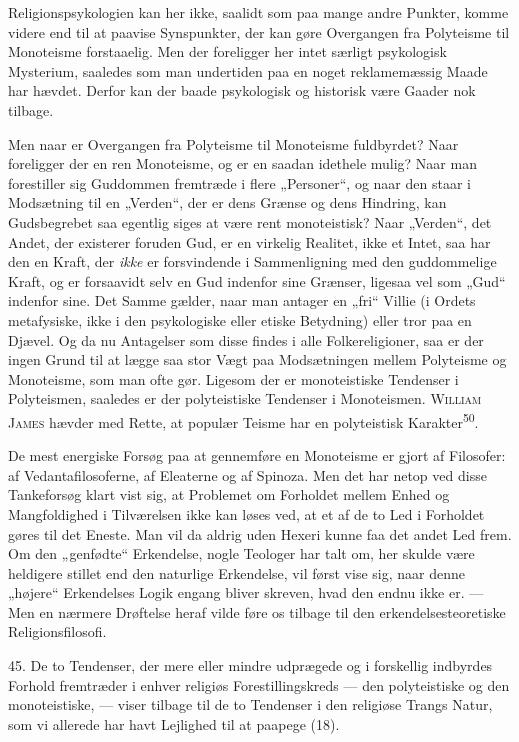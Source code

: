 \documentclass[12pt,a4paper,openany]{book}
\newcommand{\opage}[1]{\marginnote{\footnotesize\textit{[#1]}}}
\begin{document}
Religionspsykologien kan her ikke, saalidt som paa mange andre Punkter,
komme videre end til at paavise Synspunkter, der kan gøre Overgangen fra
Polyteisme til Monoteisme forstaaelig. Men der foreligger her intet
særligt psykologisk Mysterium, saaledes som man undertiden paa en noget
reklamemæssig Maade har hævdet. Derfor kan der baade psykologisk og
historisk være Gaader nok tilbage.

Men naar er Overgangen fra Polyteisme til Monoteisme fuldbyrdet? Naar
foreligger der en ren Monoteisme, og er en saadan idethele mulig? Naar
man forestiller sig Guddommen fremtræde i flere „Personer“, og naar den
staar i Modsætning til en „Verden“, der er dens Grænse og dens Hindring,
kan Gudsbegrebet saa egentlig siges at være rent monoteistisk? Naar
„Verden“, det Andet, der existerer foruden Gud, er en virkelig Realitet,
ikke et Intet, saa har den en Kraft, der \textit{ikke} er forsvindende i
Sammenligning med den guddommelige Kraft, og er forsaavidt selv en Gud
indenfor sine Grænser, ligesaa vel som „Gud“ indenfor sine. Det Samme
gælder, naar man antager en „fri“ Villie (i Ordets metafysiske, ikke i
den psykologiske eller etiske Betydning) eller tror paa en Djævel. Og da
nu Antagelser som disse findes i alle Folkereligioner, saa er der ingen
Grund til at lægge saa stor Vægt paa Modsætningen mellem Polyteisme og
Monoteisme, som man ofte gør. Ligesom der er monoteistiske Tendenser i
Polyteismen, saaledes er der polyteistiske Tendenser i Monoteismen.
\textsc{William James} hævder med Rette, at populær Teisme har en
polyteistisk Karakter\textsuperscript{50}.

De mest energiske Forsøg paa at gennemføre en Monoteisme er gjort af
Filosofer: af Vedantafilosoferne, af Eleaterne og af Spinoza. Men det
har netop ved disse Tankeforsøg klart vist sig, at Problemet om
Forholdet mellem Enhed og Mangfoldighed i Tilværelsen ikke kan løses
ved, at et af de to Led i Forholdet gøres til det Eneste. Man vil da
aldrig uden Hexeri kunne faa det andet Led frem. Om den „genfødte“
Erkendelse, nogle Teologer har talt om, her skulde være heldigere
stillet end den naturlige Erkendelse, vil først vise sig, naar denne
„højere“ Erkendelses Logik engang bliver skreven, hvad den endnu ikke
er. --- Men en nærmere Drøftelse heraf vilde føre os tilbage til den
erkendelsesteoretiske Religionsfilosofi.

\opage{106}45. De to Tendenser, der mere eller mindre udprægede og i
forskellig indbyrdes Forhold fremtræder i enhver religiøs
Forestillingskreds --- den polyteistiske og den monoteistiske, --- viser
tilbage til de to Tendenser i den religiøse Trangs Natur, som vi
allerede har havt Lejlighed til at paapege (18).
\end{document}
